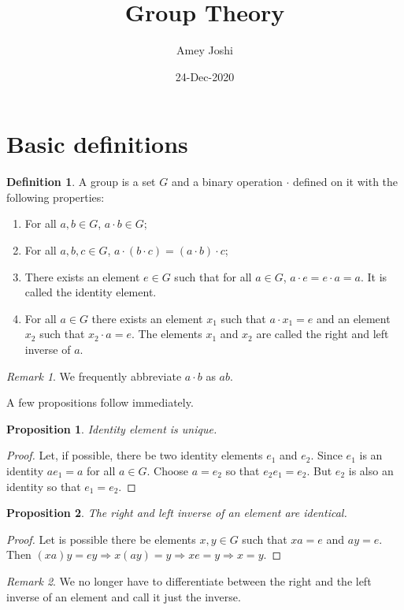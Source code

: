 \documentclass{article}
\title{Group Theory}
\author{Amey Joshi}
\date{24-Dec-2020}
\theoremstyle{plain}
\numberwithin{thm}{section}
\theoremstyle{plain}
\newtheorem{prop}{Proposition}
\numberwithin{prop}{section}
\theoremstyle{definition}
\newtheorem{defn}{Definition}
\numberwithin{defn}{section}
\theoremstyle{remark}
\newtheorem*{rem}{Remark}
\numberwithin{equation}{section}
\begin{document}
\maketitle
\section{Basic definitions}\label{s1}
\begin{defn}\label{s1d1}
A group is a set $G$ and a binary operation $\cdot$ defined on it with the
following properties:
\begin{enumerate}
\item For all $a, b \in G$, $a \cdot b \in G$;
\item For all $a, b, c \in G$, $a \cdot (b \cdot c)= (a \cdot b) \cdot c$;
\item There exists an element $e \in G$ such that for all $a \in G$, $a \cdot e
= e \cdot a = a$. It is called the identity element.
\item For all $a \in G$ there exists an element $x_1$ such that $a \cdot x_1 = 
e$ and an element $x_2$ such that $x_2 \cdot a = e$. The elements $x_1$ and 
$x_2$ are called the right and left inverse of $a$.
\end{enumerate}
\end{defn}
\begin{rem}
We frequently abbreviate $a \cdot b$ as $ab$.
\end{rem}

A few propositions follow immediately.
\begin{prop}\label{s1p1}
Identity element is unique.
\end{prop}
\begin{proof}
Let, if possible, there be two identity elements $e_1$ and $e_2$. Since $e_1$
is an identity $a e_1 = a$ for all $a \in G$. Choose $a = e_2$ so that $e_2
e_1 = e_2$. But $e_2$ is also an identity so that $e_1 = e_2$.
\end{proof}

\begin{prop}\label{s1p2}
The right and left inverse of an element are identical.
\end{prop}
\begin{proof}
Let is possible there be elements $x, y \in G$ such that $xa = e$ and $ay = e$.
Then $(xa)y = ey \Rightarrow x(ay) = y \Rightarrow xe = y \Rightarrow x = y$.
\end{proof}

\begin{rem}
We no longer have to differentiate between the right and the left inverse of 
an element and call it just the inverse.
\end{rem}
\end{document}
